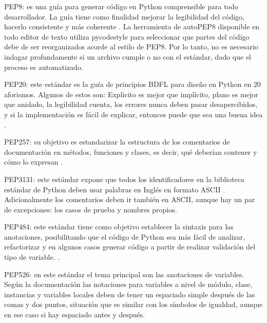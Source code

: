 \begin{APAitemize}
    \item PEP8: es una guía para generar código en Python comprensible para todo desarrollador. La guía tiene como finalidad mejorar la legibilidad del código, hacerlo consistente y más coherente \parencite{PEP8Python}. La herramienta de autoPEP8 disponible en todo editor de texto utiliza pycodestyle para seleccionar que partes del código debe de ser reorganizados acorde al estilo de PEP8. Por lo tanto, no es necesario indagar profundamente si un archivo cumple o no con el estándar, dado que el proceso es automatizado. 
    \item PEP20: este estándar es la guía de principios BDFL para diseño en Python en 20 aforismos. Algunos de estos son: Explicito es mejor que implícito, plano es mejor que anidado, la legibilidad cuenta, los errores nunca deben pasar desapercibidos, y si la implementación es fácil de explicar, entonces puede que sea una buena idea \parencite{PEP20Python}. 
    \item PEP257: su objetivo es estandarizar la estructura de los comentarios de documentación en métodos, funciones y clases, es decir, qué deberían contener y cómo lo expresan \parencite{PEP257Python}.
    \item PEP3131: este estándar expone que todos los identificadores en la biblioteca estándar de Python deben usar palabras en Inglés en formato ASCII \parencite{PEP3131Python}. Adicionalmente los comentarios deben ir también en ASCII, aunque hay un par de excepciones: los casos de prueba y nombres propios.
    \item PEP484: este estándar tiene como objetivo establecer la sintaxis para las anotaciones, posibilitando que el código de Python sea más fácil de analizar, refactorizar y en algunos casos generar código a partir de realizar validación del tipo de variable. \parencite{PEP484Python}.
    \item PEP526: en este estándar el tema principal son las anotaciones de variables. Según la documentación \parencite{PEP526Python} las notaciones para variables a nivel de módulo, clase, instancias y variables locales deben de tener un espaciado simple después de las comas y dos puntos, situación que es similar con los símbolos de igualdad, aunque en ese caso si hay espaciado antes y después. 
\end{APAitemize}

